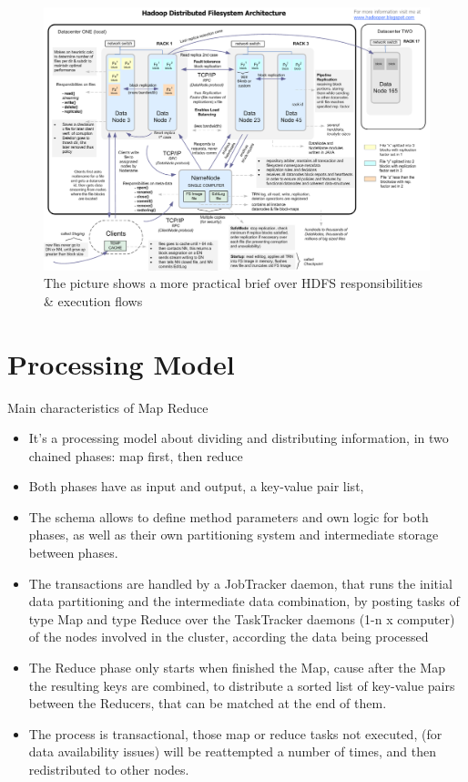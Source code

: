 \documentclass[12pt, right open]{memoir}
\begin{document}
\begin{figure}
\caption{The picture shows a more practical brief over HDFS responsibilities \& execution flows}
\label{tab:hdfs_resposibilities_and_execution_flow}
\centering
\includegraphics[scale=.33]{HadoopDFSArchitecture.png}
\end{figure}


\section{Processing Model}
Main characteristics of Map Reduce   \\

\begin{itemize}
\item It's a processing model about dividing and distributing information, in two chained phases: map first, then reduce
\item Both phases have as input and output, a key-value pair list, 
\item The schema allows to define method parameters and own logic for both phases, as well as their own partitioning system and intermediate storage between phases.
\item The transactions are handled by a JobTracker daemon, that runs the initial data partitioning and the intermediate data combination, by posting tasks of type Map and type Reduce over the TaskTracker daemons (1-n x computer) of the nodes involved in the cluster, according the data being processed
\item The Reduce phase only starts when finished the Map, cause after the Map the resulting keys are combined, to distribute a sorted list of key-value pairs between the Reducers, that can be matched at the end of them.
\item The process is transactional, those map or reduce tasks not executed, (for data availability issues) will be reattempted a number of times, and then redistributed to other nodes.
\end{itemize}
\end{document}
